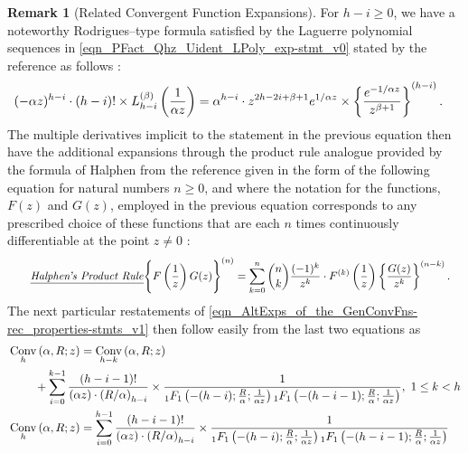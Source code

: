 \documentclass[12pt,reqno]{article}
\numberwithin{sfootnote}{section}
\numberwithin{equation}{section}
\newcommand{\tagtext}[1]{\tag*{\underline{\textit{#1}}}}
\theoremstyle{DefaultTheoremStyle}
\theoremstyle{definition}
\newtheorem{remark}[theorem]{Remark}
\newcommand{\Pochhammer}[2]{\ensuremath{\left(#1\right)_{#2}}}
\newcommand{\ConvGF}[4]{\ensuremath{\Conv_{#1}\left(#2, #3; #4\right)}}
\DeclareMathOperator{\Conv}{Conv}
\begin{document}
\begin{remark}[Related Convergent Function Expansions] 
For $h-i \geq 0$, 
we have a noteworthy Rodrigues--type formula 
satisfied by the Laguerre polynomial sequences in 
\eqref{eqn_PFact_Qhz_Uident_LPoly_exp-stmt_v0} 
stated by the reference as follows \citep[\S 18.5(ii)]{NISTHB}: 
\begin{align} 
\notag 
(-\alpha z)^{h-i} \cdot (h-i)! \times 
     L_{h-i}^{(\beta)}\left(\frac{1}{\alpha z}\right) & = 
     \alpha^{h-i} \cdot z^{2h-2i+\beta+1} e^{1 / \alpha z} \times 
     \left\{ 
     \frac{e^{-1 / \alpha z}}{z^{\beta+1}} 
     \right\}^{(h-i)}. 
\end{align} 
The multiple derivatives implicit to the statement in the previous 
equation then have the additional expansions through the 
product rule analogue provided by the formula of Halphen 
from the reference given in the form of the following equation 
for natural numbers $n \geq 0$, and where the 
notation for the functions, $F(z)$ and $G(z)$, employed in the 
previous equation corresponds to any prescribed choice of these functions 
that are each $n$ times continuously differentiable at the point $z \neq 0$ 
\citep[\S 3 Exercises, p.\ 161]{ADVCOMB}: 
\begin{align*} 
\tagtext{Halphen's Product Rule} 
\Biggl\{ F\left(\frac{1}{z}\right) G(z) \Biggr\}^{(n)} & = 
     \sum_{k=0}^{n} \binom{n}{k} \frac{(-1)^{k}}{z^{k}} \cdot 
     F^{(k)}\left(\frac{1}{z}\right) 
     \left\{ \frac{G(z)}{z^{k}} \right\}^{(n-k)}. 
\end{align*} 
The next particular restatements of 
\eqref{eqn_AltExps_of_the_GenConvFns-rec_properties-stmts_v1} 
then follow easily from the last two equations as 
\begin{align} 
\notag 
& \ConvGF{h}{\alpha}{R}{z} = 
     \ConvGF{h-k}{\alpha}{R}{z} \\ 
\notag 
     & \phantom{\Conv_h } + 
     \sum_{i=0}^{k-1} 
     \frac{(h-i-1)!}{(\alpha z) \cdot \Pochhammer{R / \alpha}{h-i}} \times 
     \frac{1}{_1F_1\left(-(h-i); \frac{R}{\alpha}; \frac{1}{\alpha z}\right) 
     {_1F_1}\left(-(h-i-1); \frac{R}{\alpha}; \frac{1}{\alpha z}\right)},\ 
     1 \leq k < h \\ 
\notag 
& \ConvGF{h}{\alpha}{R}{z} = 
     \sum_{i=0}^{h-1} 
     \frac{(h-i-1)!}{(\alpha z) \cdot \Pochhammer{R / \alpha}{h-i}} \times 
     \frac{1}{_1F_1\left(-(h-i); \frac{R}{\alpha}; \frac{1}{\alpha z}\right) 
     {_1F_1}\left(-(h-i-1); \frac{R}{\alpha}; \frac{1}{\alpha z}\right)} \\ 

\end{align}
\end{remark}
\end{document}
